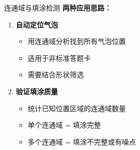 \begin{frame}{连通域与填涂检测}
    \textbf{两种应用思路：}

    \begin{enumerate}
        \item \textbf{自动定位气泡}
            \begin{itemize}
                \item 用连通域分析找到所有气泡位置
                \item 适用于非标准答题卡
                \item 需要结合形状筛选
            \end{itemize}

        \item \textbf{验证填涂质量}
            \begin{itemize}
                \item 统计已知位置区域的连通域数量
                \item 单个连通域 = 填涂完整
                \item 多个连通域 = 填涂不完整或有噪点
            \end{itemize}
    \end{enumerate}
\end{frame}
